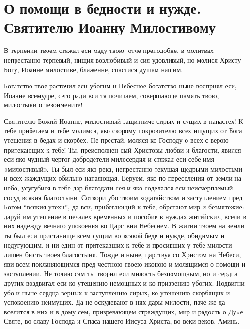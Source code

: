 \mychapterending


 

\section{О помощи в бедности и нужде. Святителю Иоанну Милостивому}\begin{mymulticols}
 


В терпении твоем стяжал еси мзду твою, отче преподобне, в молитвах непрестанно терпевый, нищия возлюбивый и сия удовливый, но молися Христу Богу, Иоанне милостиве, блаженне, спастися душам нашим.


Богатство твое расточил еси убогим и Небесное богатство ныне восприял еси, Иоанне всемудре, сего ради вси тя почитаем, совершающе память твою, милостыни о тезоимените!


Святителю Божий Иоанне, милостивый защитниче сирых и сущих в напастех! К тебе прибегаем и тебе молимся, яко скорому покровителю всех ищущих от Бога утешения в бедах и скорбех. Hе престай, моляся ко Господу о всех с верою притекающих к тебе! Ты, преисполнен сый Христовы любви и благости, явился еси яко чудный чертог добродетели милосердия и стяжал еси себе имя «милостивый». Ты был еси яко река, непрестанно текущая щедрыми милостьми и всех жаждущих обильно напаяющая. Веруем, яко по переселении от земли на небо, усугубися в тебе дар благодати сея и яко соделался еси неисчерпаемый сосуд всякия благостыни. Сотвори убо твоим ходатайством и заступлением пред Богом “всякия утехи”, да вси, прибегающий к тебе, обретают мир и безмятежие: даруй им утешение в печалех временных и пособие в нуждах житейских, всели в них надежду вечнаго упокоения во Царствии Небеснем. В житии твоем на земли ты был еси пристанище всем сущим во всякой беде и нужде, обидимым и недугующим, и ни един от притекавших к тебе и просивших у тебе милости лишен бысть твоея благостыни. Тожде и ныне, царствуя со Христом на Небеси, яви всем покланяющимся пред честною твоею иконою и молящимся о помощи и заступлении. Не точию сам ты творил еси милость безпомощным, но и сердца других воздвигал еси ко утешению немощных и ко призрению убогих. Подвигни убо и ныне сердца верных к заступлению сирых, ко утешению скорбящих и успокоению неимущих. Да не оскудевают в них дары милости, паче же да вселится в них и в дому сем, призревающем страждущих, мир и радость о Дуxе Святе, во славу Господа и Спаса нашего Иисуса Христа, во веки веков. Аминь.

\end{mymulticols}

